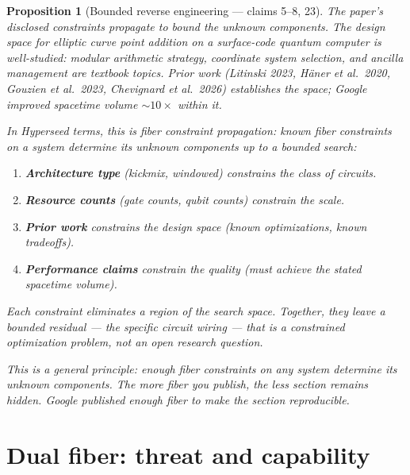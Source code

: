\documentclass[11pt,a4paper]{article}
\newtheorem{proposition}[definition]{Proposition}
\begin{document}
\begin{proposition}[Bounded reverse engineering --- claims 5--8, 23]
\label{prop:propagation}
The paper's disclosed constraints propagate to bound the unknown
components. The design space for elliptic curve point addition on
a surface-code quantum computer is well-studied: modular arithmetic
strategy, coordinate system selection, and ancilla management are
textbook topics. Prior work (Litinski 2023, H\"aner et al.\ 2020,
Gouzien et al.\ 2023, Chevignard et al.\ 2026) establishes the
space; Google improved spacetime volume ${\sim}10\times$ within it.

In Hyperseed terms, this is \emph{fiber constraint propagation}:
known fiber constraints on a system determine its unknown components
up to a bounded search:
\begin{enumerate}
\item \textbf{Architecture type} (kickmix, windowed) constrains the
  class of circuits.
\item \textbf{Resource counts} (gate counts, qubit counts) constrain
  the scale.
\item \textbf{Prior work} constrains the design space (known
  optimizations, known tradeoffs).
\item \textbf{Performance claims} constrain the quality (must achieve
  the stated spacetime volume).
\end{enumerate}

Each constraint eliminates a region of the search space. Together,
they leave a bounded residual --- the specific circuit wiring ---
that is a constrained optimization problem, not an open research
question.

This is a general principle: enough fiber constraints on any system
determine its unknown components. The more fiber you publish, the
less section remains hidden. Google published enough fiber to make
the section reproducible.
\end{proposition}

\section{Dual fiber: threat and capability}
\label{sec:dual}
\end{document}
